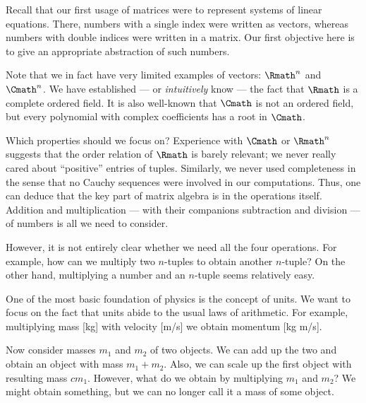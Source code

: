 \label{sec:vectorspace}

Recall that our first usage of matrices
were to represent systems of linear equations.
There, numbers with a single index were written as vectors,
whereas numbers with double indices were written in a matrix.
Our first objective here
is to give an appropriate abstraction of such numbers.

\begin{example}
    \label{exm:vspintro}
    Note that we in fact have very limited examples of vectors:
    \(\Rmath^n\) and \(\Cmath^n\).
    We have established
    --- or \emph{intuitively} know ---
    the fact that \(\Rmath\) is a complete ordered field.
    It is also well-known that
    \(\Cmath\) is not an ordered field,
    but every polynomial with complex coefficients
    has a root in \(\Cmath\).

    Which properties should we focus on?
    Experience with \(\Cmath\) or \(\Rmath^n\) suggests that
    the order relation of \(\Rmath\) is barely relevant;
    we never really cared about ``positive'' entries of tuples.
    Similarly, we never used completeness in the sense that
    no Cauchy sequences were involved in our computations.
    Thus, one can deduce that
    the key part of matrix algebra is in the operations itself.
    Addition and multiplication
    --- with their companions subtraction and division ---
    of numbers is all we need to consider.

    However, it is not entirely clear whether
    we need all the four operations.
    For example, how can we multiply two \(n\)-tuples
    to obtain another \(n\)-tuple?
    On the other hand,
    multiplying a number and an \(n\)-tuple seems relatively easy.
\end{example}

\begin{example}
    \label{exm:vspintro2}
    One of the most basic foundation of physics is the concept of units.
    We want to focus on the fact that
    units abide to the usual laws of arithmetic.
    For example, multiplying mass [kg] with velocity [m/s]
    we obtain momentum [kg m/s].

    Now consider masses \(m_1\) and \(m_2\) of two objects.
    We can add up the two and obtain an object with mass \(m_1+m_2\).
    Also, we can scale up the first object with resulting mass \(cm_1\).
    However, what do we obtain by multiplying \(m_1\) and \(m_2\)?
    We might obtain something,
    but we can no longer call it a mass of some object.
\end{example}

